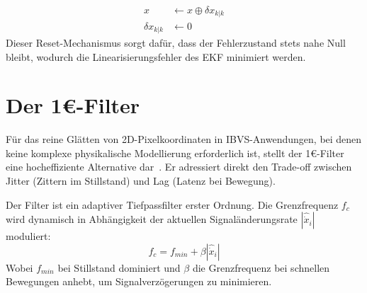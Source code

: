 \begin{align}
    x &\leftarrow x \oplus \delta x_{k|k} \\
    \delta x_{k|k} &\leftarrow 0
\end{align}
Dieser Reset-Mechanismus sorgt dafür, dass der Fehlerzustand stets nahe Null bleibt, wodurch die Linearisierungsfehler des \ac{EKF} minimiert werden.

\section{Der 1\euro{}-Filter}
\label{sec:1EuroFilter}
Für das reine Glätten von 2D-Pixelkoordinaten in \ac{IBVS}-Anwendungen, bei denen keine komplexe physikalische Modellierung erforderlich ist, stellt der 1\euro{}-Filter eine hocheffiziente Alternative dar~\cite{casiez20121euro}. Er adressiert direkt den Trade-off zwischen Jitter (Zittern im Stillstand) und Lag (Latenz bei Bewegung).

Der Filter ist ein adaptiver Tiefpassfilter erster Ordnung. Die Grenzfrequenz $f_c$ wird dynamisch in Abhängigkeit der aktuellen Signaländerungsrate $|\hat{\dot{x}}_i|$ moduliert:
\begin{equation}
    f_c = f_{min} + \beta |\hat{\dot{x}}_i|
\end{equation}
Wobei $f_{min}$ bei Stillstand dominiert und $\beta$ die Grenzfrequenz bei schnellen Bewegungen anhebt, um Signalverzögerungen zu minimieren.

